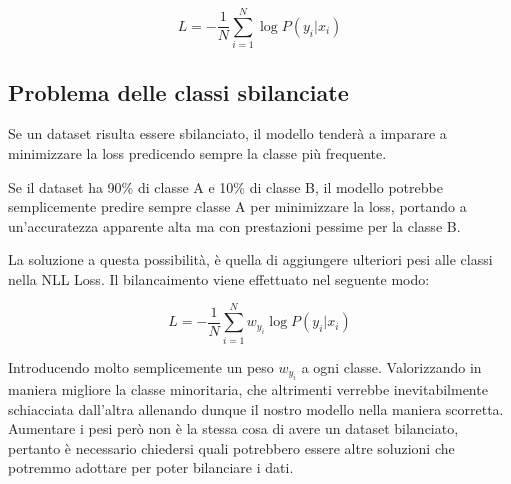 \begin{equation}
    L = -\frac{1}{N}\sum^{N}_{i=1}\log P(y_i|x_i)
\end{equation}

\subsection{Problema delle classi sbilanciate}
Se un dataset risulta essere sbilanciato, il modello tenderà a imparare a minimizzare la loss predicendo sempre la classe più frequente.

\begin{Esempio}
    Se il dataset ha 90\% di classe A e 10\% di classe B, il modello potrebbe semplicemente predire sempre classe A per minimizzare la loss, portando a un'accuratezza apparente alta ma con prestazioni pessime per la classe B.
\end{Esempio}

La soluzione a questa possibilità, è quella di aggiungere ulteriori pesi alle classi nella NLL Loss. Il bilancaimento viene effettuato nel seguente modo:

\begin{equation}
    L = -\frac{1}{N}\sum^{N}_{i=1}w_{y_i}\log P(y_i|x_i)
\end{equation}

Introducendo molto semplicemente un peso $w_{y_i}$ a ogni classe. Valorizzando in maniera migliore la classe minoritaria, che altrimenti verrebbe inevitabilmente schiacciata dall'altra allenando dunque il nostro modello nella maniera scorretta. Aumentare i pesi però non è la stessa cosa di avere un dataset bilanciato, pertanto è necessario chiedersi quali potrebbero essere altre soluzioni che potremmo adottare per poter bilanciare i dati.

